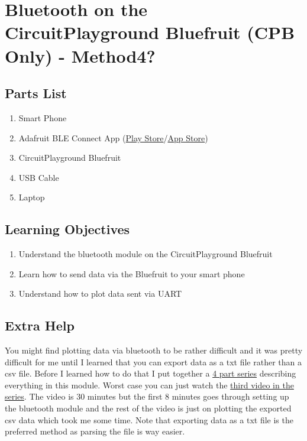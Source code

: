\newpage

\section{Bluetooth on the CircuitPlayground Bluefruit (CPB Only) - Method4?}
\label{s:Bluetooth}

\subsection{Parts List}

\begin{enumerate}[itemsep=-5pt]
\item Smart Phone
\item Adafruit BLE Connect App (\href{https://play.google.com/store/apps/details?id=com.adafruit.bluefruit.le.connect}{Play Store}/\href{https://apps.apple.com/us/app/bluefruit-connect/id830125974}{App Store})
\item CircuitPlayground Bluefruit
\item USB Cable
\item Laptop
\end{enumerate}

\subsection{Learning Objectives}
\begin{enumerate}[itemsep=-5pt]
\item Understand the bluetooth module on the CircuitPlayground Bluefruit
\item Learn how to send data via the Bluefruit to your smart phone
\item Understand how to plot data sent via UART
\end{enumerate}

\subsection{Extra Help}

You might find plotting data via bluetooth to be rather difficult and
it was pretty difficult for me until I learned that you can export
data as a txt file rather than a csv file. Before I learned how to do
that I put together
a \href{https://www.youtube.com/playlist?list=PL_D7_GvGz-v0-U3JACRMgldvqQqn2mje9}{4
part series} describing everything in this module. Worst case you can
just watch
the \href{https://www.youtube.com/watch?v=9EHNFdVX9O8&list=PL_D7_GvGz-v0-U3JACRMgldvqQqn2mje9&index=3}{third
video in the series}. The video is 30 minutes but the first 8 minutes
goes through setting up the bluetooth module and the rest of the video
is just on plotting the exported csv data which took me some
time. Note that exporting data as a txt file is the preferred method
as parsing the file is way easier.

